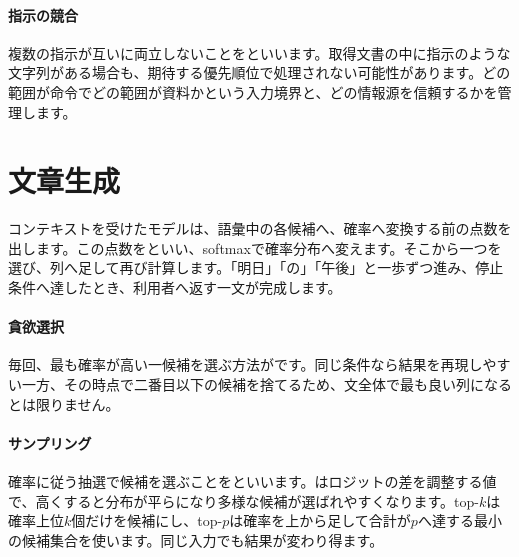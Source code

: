 \paragraph{指示の競合}
        複数の指示が互いに両立しないことをといいます。取得文書の中に指示のような文字列がある場合も、期待する優先順位で処理されない可能性があります。どの範囲が命令でどの範囲が資料かという入力境界と、どの情報源を信頼するかを管理します。

\par
\endgroup
\par
\endgroup


\section{文章生成}
\label{sec:06-machine-learning-30}

コンテキストを受けたモデルは、語彙中の各候補へ、確率へ変換する前の点数を出します。この点数をといい、softmaxで確率分布へ変えます。そこから一つを選び、列へ足して再び計算します。「明日」「の」「午後」と一歩ずつ進み、停止条件へ達したとき、利用者へ返す一文が完成します。

\begingroup
  \centering
  \vspace{5mm}
\begingroup
\paragraph{貪欲選択}
        毎回、最も確率が高い一候補を選ぶ方法がです。同じ条件なら結果を再現しやすい一方、その時点で二番目以下の候補を捨てるため、文全体で最も良い列になるとは限りません。

\par
\endgroup
\medskip
\begingroup
\paragraph{サンプリング}
        確率に従う抽選で候補を選ぶことをといいます。はロジットの差を調整する値で、高くすると分布が平らになり多様な候補が選ばれやすくなります。top-$k$は確率上位$k$個だけを候補にし、top-$p$は確率を上から足して合計が$p$へ達する最小の候補集合を使います。同じ入力でも結果が変わり得ます。

